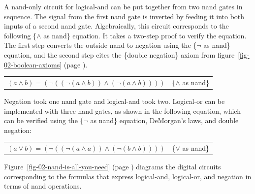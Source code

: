 A nand-only circuit for logical-and can be
put
together from two nand gates in sequence.
The signal from the first nand gate is inverted
by feeding it into both inputs of a second nand gate.
Algebraically, this circuit corresponds to the following \{$\wedge$ as nand\} equation.
It takes a two-step proof to verify the equation.
The first step converts the outside nand to negation using the
\{$\neg$ as nand\} equation, and the second step cites
the \{double negation\} axiom from figure~\ref{fig-02-boolean-axioms}
(page \pageref{fig-02-boolean-axioms}).

\begin{center}
\begin{tabular}{ll}
$(a \wedge b) = (\neg ((\neg (a \wedge b)) \wedge (\neg (a \wedge b))))$ & \{$\wedge$ as nand\}\label{and-as-nand}
\end{tabular}
\end{center}

Negation took one nand gate and
logical-and took two.
Logical-or can be implemented with three nand gates,
as shown in the following equation,
which can be verified using
the \{$\neg$ as nand\} equation, DeMorgan's laws,
and double negation:

\begin{center}
\begin{tabular}{ll}
$(a \vee b) = (\neg ((\neg(a \wedge a)) \wedge (\neg(b \wedge b))))$ & \{$\vee$ as nand\}\label{or-as-nand}
\end{tabular}
\end{center}

Figure~\ref{fig-02-nand-is-all-you-need} (page \pageref{fig-02-nand-is-all-you-need})
diagrams the digital circuits
corresponding to the formulas that express logical-and, logical-or, and negation
in terms of nand operations.

